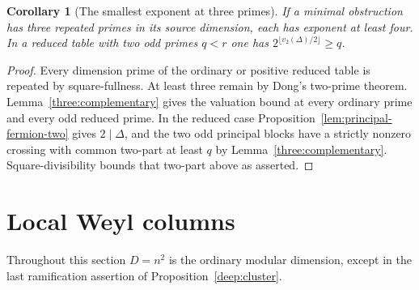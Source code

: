 \documentclass[11pt,a4paper]{article}
\numberwithin{equation}{section}
\newtheorem{corollary}[theorem]{Corollary}
\theoremstyle{remark}
\begin{document}
\begin{corollary}[The smallest exponent at three primes]\label{prop:reduced-quartic-two-exclusion}
If a minimal obstruction has three repeated primes in its source dimension, each has exponent at least four. In a reduced table with two odd primes $q<r$ one has $2^{\lfloor v_2(\Delta)/2\rfloor}\ge q$.
\end{corollary}
\begin{proof}
Every dimension prime of the ordinary or positive reduced table is repeated by square-fullness. At least three remain by Dong's two-prime theorem. Lemma~\ref{three:complementary} gives the valuation bound at every ordinary prime and every odd reduced prime. In the reduced case Proposition~\ref{lem:principal-fermion-two} gives $2\mid\Delta$, and the two odd principal blocks have a strictly nonzero crossing with common two-part at least $q$ by Lemma~\ref{three:complementary}. Square-divisibility bounds that two-part above as asserted.
\end{proof}

\section{Local Weyl columns}
Throughout this section $D=n^2$ is the ordinary modular dimension, except in the last ramification assertion of Proposition~\ref{deep:cluster}.
\end{document}
